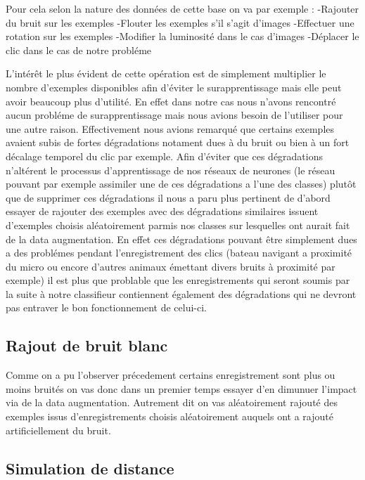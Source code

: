 Pour cela selon la nature des données de cette base on va par exemple :
-Rajouter du bruit sur les exemples
-Flouter les exemples s'il s'agit d'images
-Effectuer une rotation sur les exemples
-Modifier la luminosité dans le cas d'images
-Déplacer le clic dans le cas de notre probléme

L'intérêt le plus évident de cette opération est de simplement multiplier le nombre d'exemples disponibles afin d'éviter le surapprentissage mais elle peut avoir beaucoup plus d'utilité. En effet dans notre cas nous n'avons rencontré aucun probléme de surapprentissage mais nous avions besoin de l'utiliser pour une autre raison.
Effectivement nous avions remarqué que certains exemples avaient subis de fortes dégradations notament dues à du bruit ou bien à un fort décalage temporel du clic par exemple. Afin d'éviter que ces dégradations n'altérent le processus d'apprentissage de nos réseaux de neurones (le réseau pouvant par exemple assimiler une de ces dégradations a l'une des classes) plutôt que de supprimer ces dégradations il nous a paru plus pertinent de d'abord essayer de rajouter des exemples avec des dégradations similaires issuent d'exemples choisis aléatoirement parmis nos classes sur lesquelles ont aurait fait de la data augmentation. En effet ces dégradations pouvant être simplement dues a des problémes pendant l'enregistrement des clics (bateau navigant a proximité du micro ou encore d'autres animaux émettant divers bruits à proximité par exemple) il est plus que problable que les enregistrements qui seront soumis par la suite à notre classifieur contiennent également des dégradations qui ne devront pas entraver le bon fonctionnement de celui-ci.

\hypertarget{Rajout-de-bruit-blanc}{%
\subsection{Rajout de bruit blanc}
\label{Rajout-de-bruit-blanc}}

Comme on a pu l'observer précedement certains enregistrement sont plus ou moins bruités on vas donc dans un premier temps essayer d'en dimunuer l'impact via de la data augmentation. Autrement dit on vas aléatoirement rajouté des exemples issus d'enregistrements choisis aléatoirement auquels ont a rajouté artificiellement du bruit.

\hypertarget{Simulation-de-distance}{%
\subsection{Simulation de distance}
\label{Simulation-de-distance}}

